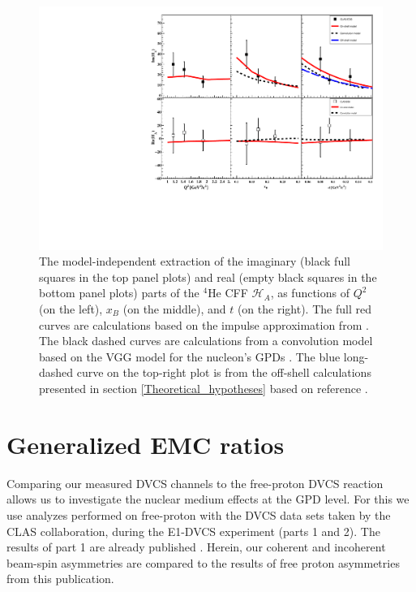 \begin{figure}[h!]
\includegraphics[scale=0.8]{fig_Dec2016/Coherent_CFF.pdf}
\caption{The model-independent extraction of the imaginary (black full squares 
in the top panel plots) and real (empty black squares in the bottom panel 
plots) parts of the $^4$He CFF $\mathcal{H}_A$, as functions of $Q^{2}$ (on the 
left), $x_B$ (on the middle), and $t$ (on the right). The full red curves are 
calculations based on the impulse approximation from \cite{Vadim_priv}.  The 
black dashed curves are calculations from a convolution model based on the VGG 
model for the nucleon's GPDs \cite{Guidal_priv}. The blue long-dashed curve on 
the top-right plot is from the off-shell calculations presented in section 
\ref{Theoretical_hypotheses} based on reference 
\cite{GonzalezHernandez:2012jv}.  }
\label{fig:HA_CFF}
\end{figure}


\section{Generalized EMC ratios} \label{sec:Generalized_EMC}
Comparing our measured DVCS channels to the free-proton DVCS reaction 
allows us to investigate the nuclear medium effects at the GPD level. For this 
we use analyzes performed on free-proton with the DVCS data sets taken by the CLAS 
collaboration, during the E1-DVCS experiment (parts 1 and 2). The results of 
part 1 are already published \cite{FX_BSA, CLAS_cross_section}. Herein, our 
coherent and incoherent beam-spin asymmetries are compared to the results of
free proton asymmetries from this publication.


